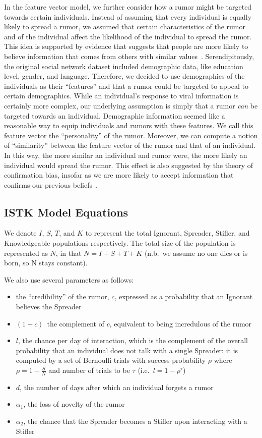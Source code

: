 In the feature vector model, we further consider how a rumor might be targeted towards certain individuals.
Instead of assuming that every individual is equally likely to spread a rumor, we assumed that certain characteristics of the rumor and of the individual affect the likelihood of the individual to spread the rumor.
This idea is supported by evidence that suggests that people are more likely to believe information that comes from others with similar values~\cite{gillespie-2004}.
Serendipitously, the original social network dataset included demographic data, like education level, gender, and language.
Therefore, we decided to use demographics of the individuals as their ``features'' and that a rumor could be targeted to appeal to certain demographics.
While an individual's response to viral information is certainly more complex, our underlying assumption is simply that a rumor \textit{can} be targeted towards an individual.
Demographic information seemed like a reasonable way to equip individuals and rumors with these features.
We call this feature vector the ``personality'' of the rumor.
Moreover, we can compute a notion of ``similarity'' between the feature vector of the rumor and that of an individual.
In this way, the more similar an individual and rumor were, the more likely an individual would spread the rumor.
This effect is also suggested by the theory of confirmation bias, insofar as we are more likely to accept information that confirms our previous beliefs~\cite{wason-1960}.

\subsection{ISTK Model Equations}
\label{subsec:istkeqns}

We denote $ I $, $ S $, $ T $, and $ K $ to represent the total Ignorant, Spreader, Stifler, and Knowledgeable populations respectively. The total size of the population is represented as $ N $, in that $ N = I + S + T + K $ (n.b.\ we assume no one dies or is born, so N stays constant).

We also use several parameters as follows:
\begin{itemize}
    \item the ``credibility'' of the rumor, $ c $, expressed as a probability that an Ignorant believes the Spreader
    \item $ (1 - c) $\, the complement of $ c $, equivalent to being incredulous of the rumor
    \item $ l $, the chance per day of interaction, which is the complement of the overall probability that an individual does not talk with a single Spreader: it is computed by a set of Bernoulli trials with success probability $ \rho $ where $ \rho = 1 - \frac{S}{N} $ and number of trials to be $ \tau $ (i.e.~$ l = 1 - \rho^\tau $)
    \item $ d $, the number of days after which an individual forgets a rumor
    \item $ \alpha_1 $, the loss of novelty of the rumor
    \item $ \alpha_2 $, the chance that the Spreader becomes a Stifler upon interacting with a Stifler
\end{itemize}

